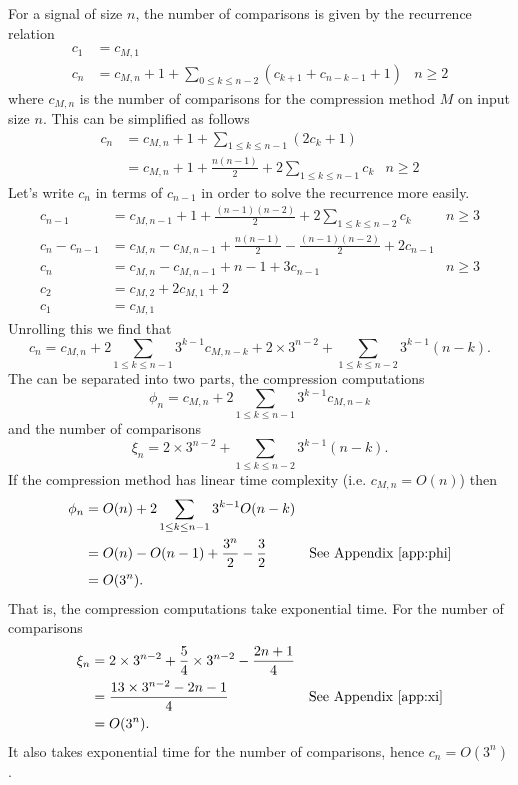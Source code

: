 For a signal of size $n$, the number of comparisons is given by the recurrence relation
\begin{align*}
	c_1 &= c_{M,1}\\
	c_n &= c_{M,n} + 1 + \sum_{0\le k\le n-2}(c_{k+1}+c_{n-k-1} + 1) &n\ge 2
\end{align*}
where $c_{M,n}$ is the number of comparisons for the compression method $M$ on input size $n$.
This can be simplified as follows
\begin{align*}
	c_n &= c_{M,n} + 1 + \sum_{1\le k\le n-1}(2c_k + 1)\\
	&= c_{M,n} + 1 + \frac{n(n-1)}{2} + 2\sum_{1\le k\le n-1}c_k &n\ge 2
\end{align*}
Let's write $c_n$ in terms of $c_{n-1}$ in order to solve the recurrence more easily.
\begin{align*}
	c_{n-1} &= c_{M,n-1} + 1 + \frac{(n-1)(n-2)}{2} + 2\sum_{1\le k\le n-2}c_k & n\ge 3\\
	c_{n} - c_{n-1} &= c_{M,n} - c_{M,n-1} + \frac{n(n-1)}{2} - \frac{(n-1)(n-2)}{2} + 2c_{n-1}\\
	c_{n} &= c_{M,n} - c_{M,n-1} + n-1 + 3c_{n-1} & n\ge 3\\
	c_2 &= c_{M,2}+2c_{M,1}+2\\
	c_1 &= c_{M,1}
\end{align*}
Unrolling this we find that
\[ c_n = c_{M,n} + 2\sum_{1\le k\le n-1}3^{k-1}c_{M,n-k}+2\times 3^{n-2}+\sum_{1\le k\le n-2}3^{k-1}(n-k). \]
The can be separated into two parts, the compression computations
\[ \phi_n = c_{M,n} + 2\sum_{1\le k\le n-1}3^{k-1}c_{M,n-k}\]
and the number of comparisons
\[ \xi_n = 2\times 3^{n-2}+\sum_{1\le k\le n-2}3^{k-1}(n-k). \]
If the compression method has linear time complexity (i.e. $c_{M,n} = O(n)$) then
\begin{align*}
	\phi_n &= O(n) + 2\sum_{1\le k\le n-1}3^{k-1}O(n-k)\\
	&= O(n) - O(n-1) + \frac{3^{n}}{2} - \frac{3}{2} & \text{See Appendix \ref{app:phi}}\\
	&= O(3^n).
\end{align*}
That is, the compression computations take exponential time. For the number of comparisons
\begin{align*}
	\xi_n &= 2\times 3^{n-2}+\frac{5}{4}\times 3^{n-2}-\frac{2n+1}{4}\\
	&= \frac{13\times 3^{n-2}-2n-1}{4} &\text{See Appendix \ref{app:xi}}\\
	&=O(3^n).
\end{align*}
It also takes exponential time for the number of comparisons, hence $c_n=O(3^n)$.

